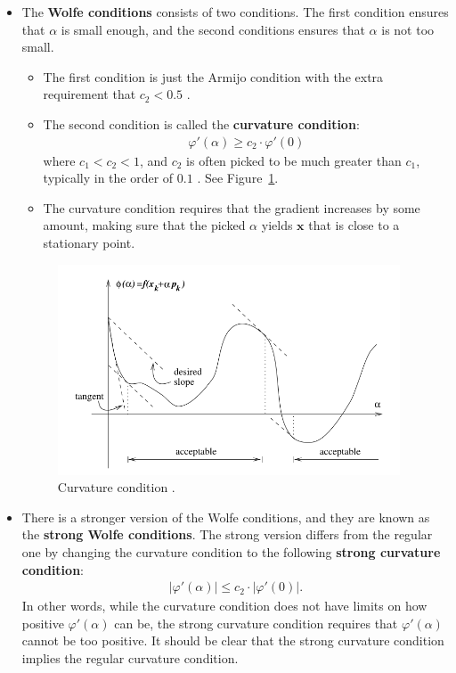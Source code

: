 \documentclass[10pt]{article}
\newcommand{\ve}[1]{\mathbf{#1}}
\begin{document}
\begin{itemize}    
    \item The {\bf Wolfe conditions} \cite{Norcedal:2006} consists of two conditions. The first condition ensures that $\alpha$ is small enough, and the second conditions ensures that $\alpha$ is not too small.
    \begin{itemize}
        \item The first condition is just the Armijo condition with the extra requirement that $c_2 < 0.5$ \cite{Madsen:2004}.
        \item The second condition is called the {\bf curvature condition}:
        \begin{align*}
            \varphi'(\alpha) \geq c_2 \cdot \varphi'(0)
        \end{align*}
        where $c_1 < c_2 < 1$, and $c_2$ is often picked to be much greater than $c_1$, typically in the order of $0.1$ \cite{Cao:2021}. See Figure~\ref{fig:wolfe-curvature-condition}. 
        
        \item The curvature condition requires that the gradient increases by some amount, making sure that the picked $\alpha$ yields $\ve{x}$ that is close to a stationary point.
    \end{itemize}    

    \begin{figure}
        \centering
        \includegraphics[width=4in]{wolfe-curvature-condition.png}
        \caption{Curvature condition \cite{Cao:2021,Norcedal:2006}.}
        \label{fig:wolfe-curvature-condition}
    \end{figure}

    \item There is a stronger version of the Wolfe conditions, and they are known as the {\bf strong Wolfe conditions}. The strong version differs from the regular one by changing the curvature condition to the following {\bf strong curvature condition}:
    \begin{align*}
        |\varphi'(\alpha)| \leq c_2 \cdot |\varphi'(0)|.
    \end{align*}
    In other words, while the curvature condition does not have limits on how positive $\varphi'(\alpha)$ can be, the strong curvature condition requires that $\varphi'(\alpha)$ cannot be too positive. It should be clear that the strong curvature condition implies the regular curvature condition.


\end{itemize}
\end{document}
